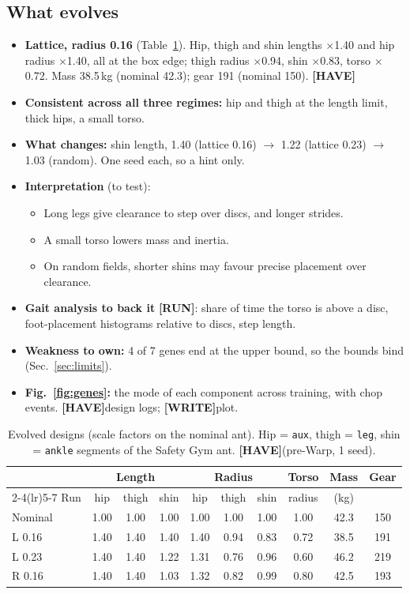 \documentclass[sigconf,review]{acmart}
\newcommand{\statustag}[2]{\textcolor{#1}{\textsf{\scriptsize\bfseries[#2]}}}
\newcommand{\HAVE}{\statustag{teal!70!black}{HAVE}\hspace{0.3em}}
\newcommand{\RUN}{\statustag{red!75!black}{RUN}\hspace{0.3em}}
\newcommand{\WRITE}{\statustag{blue!70!black}{WRITE}\hspace{0.3em}}
\begin{document}
\subsection{What evolves}
\label{sec:res-what}
\begin{itemize}
\item \textbf{Lattice, radius 0.16} (Table~\ref{tab:genes}). Hip, thigh and shin lengths $\times$1.40 and hip radius $\times$1.40, all at the box edge; thigh radius $\times$0.94, shin $\times$0.83, torso $\times$0.72. Mass 38.5\,kg (nominal 42.3); gear 191 (nominal 150). \HAVE
\item \textbf{Consistent across all three regimes:} hip and thigh at the length limit, thick hips, a small torso.
\item \textbf{What changes:} shin length, 1.40 (lattice 0.16) $\to$ 1.22 (lattice 0.23) $\to$ 1.03 (random). One seed each, so a hint only.
\item \textbf{Interpretation} (to test):
  \begin{itemize}
  \item Long legs give clearance to step over discs, and longer strides.
  \item A small torso lowers mass and inertia.
  \item On random fields, shorter shins may favour precise placement over clearance.
  \end{itemize}
\item \textbf{Gait analysis to back it} \RUN: share of time the torso is above a disc, foot-placement histograms relative to discs, step length.
\item \textbf{Weakness to own:} 4 of 7 genes end at the upper bound, so the bounds bind (Sec.~\ref{sec:limits}).
\item \textbf{Fig.~\ref{fig:genes}:} the mode of each component across training, with chop events. \HAVE design logs; \WRITE plot.
\end{itemize}

\begin{table}[t]
\caption{Evolved designs (scale factors on the nominal ant). Hip = \texttt{aux}, thigh = \texttt{leg}, shin = \texttt{ankle} segments of the Safety Gym ant. \HAVE (pre-Warp, 1 seed).}
\label{tab:genes}
\footnotesize
\setlength{\tabcolsep}{3pt}
\begin{tabular}{lccccccccc}
\toprule
 & \multicolumn{3}{c}{Length} & \multicolumn{3}{c}{Radius} & Torso & Mass & Gear \\
\cmidrule(lr){2-4}\cmidrule(lr){5-7}
Run & hip & thigh & shin & hip & thigh & shin & radius & (kg) & \\
\midrule
Nominal & 1.00 & 1.00 & 1.00 & 1.00 & 1.00 & 1.00 & 1.00 & 42.3 & 150 \\
L 0.16 & 1.40 & 1.40 & 1.40 & 1.40 & 0.94 & 0.83 & 0.72 & 38.5 & 191 \\
L 0.23 & 1.40 & 1.40 & 1.22 & 1.31 & 0.76 & 0.96 & 0.60 & 46.2 & 219 \\
R 0.16 & 1.40 & 1.40 & 1.03 & 1.32 & 0.82 & 0.99 & 0.80 & 42.5 & 193 \\
\bottomrule
\end{tabular}
\end{table}
\end{document}
